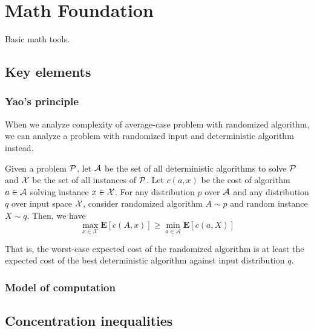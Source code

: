 \chapter{Math Foundation}
Basic math tools.

\section{Key elements}
\subsection{Yao's principle}
When we analyze complexity of average-case problem with randomized algorithm, we can analyze a problem with randomized input and deterministic algorithm instead.
\begin{thm}
 \label{yaoprin}
Given a problem $\mathcal{P}$, let $\mathcal{A}$ be the set of all deterministic algorithms to solve $\mathcal{P}$ and $\mathcal{X}$ be the set of all instances of $\mathcal{P}$.
Let $c(a,x)$ be the cost of algorithm $a\in\mathcal{A}$ solving instance $x\in\mathcal{X}$. For any distribution $p$ over $\mathcal{A}$ and any distribution $q$ over input space $\mathcal{X}$, consider randomized algorithm $A\sim p$ and random instance $X\sim q$. Then, we have
$$
\max _{x \in \mathcal{X}} \mathbf{E}[c(A, x)] \geq \min _{a \in \mathcal{A}} \mathbf{E}[c(a, X)]
$$
\end{thm}
That is, the worst-case expected cost of the randomized algorithm is at least the expected cost of the best deterministic algorithm against input distribution $q$.

\subsection{Model of computation}


\section{Concentration inequalities}


